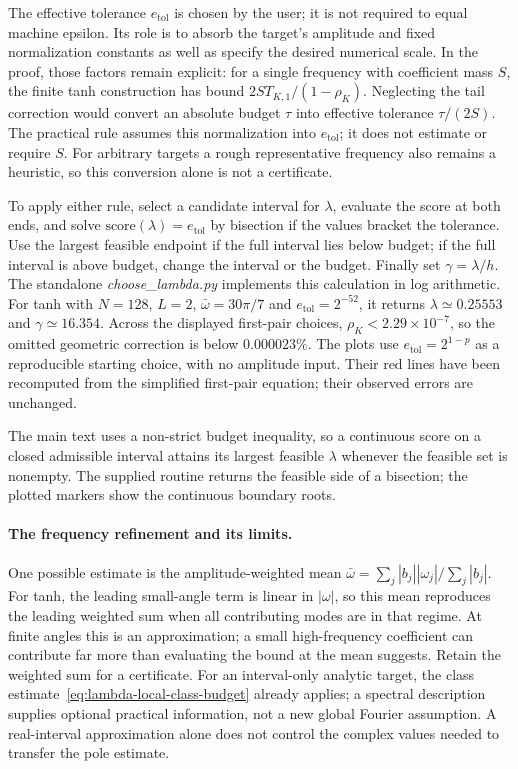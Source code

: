 The effective tolerance $e_{\mathrm{tol}}$ is chosen by the user; it is not
required to equal machine epsilon. Its role is to absorb the target's
amplitude and fixed normalization constants as well as specify the desired
numerical scale. In the proof, those factors remain explicit: for a
single frequency with coefficient mass $S$, the finite tanh construction
has bound $2S T_{K,1}/(1-\rho_K)$. Neglecting the tail correction would
convert an absolute budget $\tau$ into effective tolerance $\tau/(2S)$.
The practical rule assumes this normalization into $e_{\mathrm{tol}}$;
it does not estimate or require $S$. For arbitrary targets a rough
representative frequency also remains a heuristic, so this conversion
alone is not a certificate.

To apply either rule, select a candidate interval for $\lambda$, evaluate
the score at both ends, and solve $\text{score}(\lambda)=e_{\mathrm{tol}}$
by bisection if the values bracket the tolerance. Use the largest feasible
endpoint if the full interval lies below budget; if the full interval is
above budget, change the interval or the budget. Finally set
$\gamma=\lambda/h$. The standalone \emph{choose\_lambda.py} implements
this calculation in log arithmetic. For tanh with $N=128$, $L=2$,
$\bar\omega=30\pi/7$ and $e_{\mathrm{tol}}=2^{-52}$, it returns
$\lambda\simeq0.25553$ and $\gamma\simeq16.354$.
Across the displayed first-pair choices, $\rho_K<2.29\times10^{-7}$, so the omitted geometric correction is below $0.000023\%$.
The plots use $e_{\mathrm{tol}}=2^{1-p}$ as a reproducible starting
choice, with no amplitude input. Their red lines have been recomputed
from the simplified first-pair equation; their observed errors are unchanged.

The main text uses a non-strict budget inequality, so a continuous
score on a closed admissible interval attains its largest feasible
$\lambda$ whenever the feasible set is nonempty. The supplied routine
returns the feasible side of a bisection; the plotted markers show the
continuous boundary roots.

\paragraph{The frequency refinement and its limits.}
One possible estimate is the amplitude-weighted mean
$\bar\omega=\sum_j|b_j||\omega_j|/\sum_j|b_j|$.
For tanh, the leading small-angle term is linear in $|\omega|$, so this mean reproduces the leading weighted sum when all contributing modes are in that regime. At finite angles this is an approximation; a small high-frequency coefficient can contribute
far more than evaluating the bound at the mean suggests. Retain the
weighted sum for a certificate. For an interval-only analytic target,
the class estimate~\eqref{eq:lambda-local-class-budget} already applies;
a spectral description supplies optional practical information, not a new
global Fourier assumption. A real-interval approximation alone does not
control the complex values needed to transfer the pole estimate.

